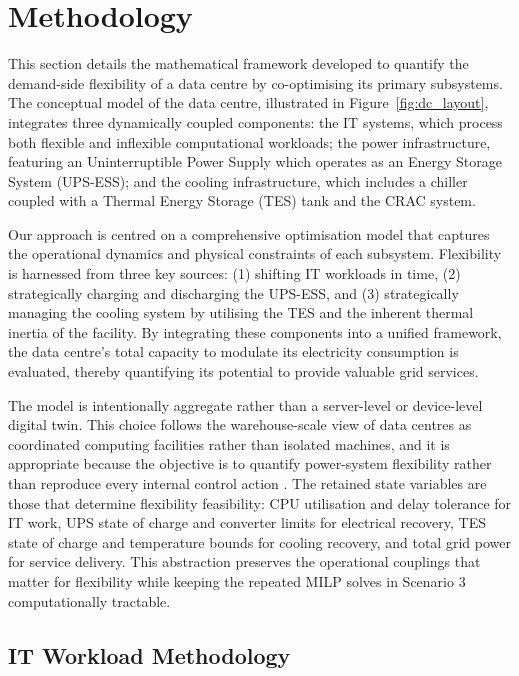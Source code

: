 \documentclass[lettersize,journal]{IEEEtran}
\newcommand{\rev}[1]{\textcolor{blue!70!black}{#1}}
\begin{document}
\section{Methodology}
This section details the mathematical framework developed to quantify the demand-side flexibility of a data centre by co-optimising its primary subsystems. The conceptual model of the data centre, illustrated in Figure~\ref{fig:dc_layout}, integrates three dynamically coupled components: the IT systems, which process both flexible and inflexible computational workloads; the power infrastructure, featuring an Uninterruptible Power Supply which operates as an Energy Storage System (UPS-ESS); and the cooling infrastructure, which includes a chiller coupled with a Thermal Energy Storage (TES) tank and the CRAC system. 

Our approach is centred on a comprehensive optimisation model that captures the operational dynamics and physical constraints of each subsystem. Flexibility is harnessed from three key sources: (1) shifting  IT workloads in time, (2) strategically charging and discharging the UPS-ESS, and (3) strategically managing the cooling system by utilising the TES and the inherent thermal inertia of the facility. By integrating these components into a unified framework, the data centre's total capacity to modulate its electricity consumption is evaluated, thereby quantifying its potential to provide valuable grid services.

\rev{The model is intentionally aggregate rather than a server-level or device-level digital twin. This choice follows the warehouse-scale view of data centres as coordinated computing facilities rather than isolated machines, and it is appropriate because the objective is to quantify power-system flexibility rather than reproduce every internal control action \cite{Barroso2026Datacenter,dayarathna2015data}. The retained state variables are those that determine flexibility feasibility: CPU utilisation and delay tolerance for IT work, UPS state of charge and converter limits for electrical recovery, TES state of charge and temperature bounds for cooling recovery, and total grid power for service delivery. This abstraction preserves the operational couplings that matter for flexibility while keeping the repeated MILP solves in Scenario 3 computationally tractable.}

\label{sec: methodology}
\subsection{IT Workload Methodology}
 
\end{document}

